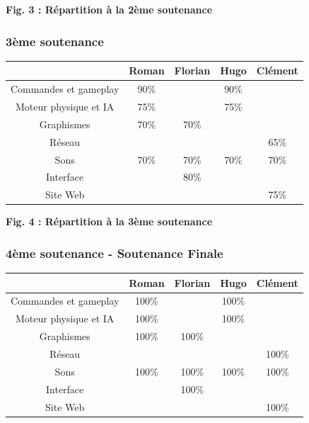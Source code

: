 \documentclass{article}
\begin{document}
\begin{center}
\bf{Fig. 3 : Répartition à la 2ème soutenance}
\end{center}



\newpage
\subsubsection{3ème soutenance}

\begin{center}
\begin{tabular}{|c|c|c|c|c|}
\hline
 & Roman & Florian & Hugo & Clément \\
\hline
Commandes et gameplay & 90\% & & 90\% & \\
\hline
Moteur physique et IA & 75\% & & 75\% & \\
\hline
Graphismes & 70\% & 70\% & & \\
\hline
Réseau & & & & 65\% \\
\hline
Sons & 70\% & 70\% & 70\% & 70\% \\
\hline
Interface & & 80\% & & \\
\hline
Site Web & & & & 75\% \\
\hline
\end{tabular}
\end{center}

\begin{center}
\bf{Fig. 4 : Répartition à la 3ème soutenance}
\end{center}

\subsubsection{4ème soutenance - Soutenance Finale}

\begin{center}
\begin{tabular}{|c|c|c|c|c|}
\hline
 & Roman & Florian & Hugo & Clément \\
\hline
Commandes et gameplay & 100\% & & 100\% & \\
\hline
Moteur physique et IA & 100\% & & 100\% & \\
\hline
Graphismes & 100\% & 100\% & & \\
\hline
Réseau & & & & 100\% \\
\hline
Sons & 100\% & 100\% & 100\% & 100\% \\
\hline
Interface & & 100\% & & \\
\hline
Site Web & & & & 100\% \\
\hline
\end{tabular}
\end{center}
\end{document}
